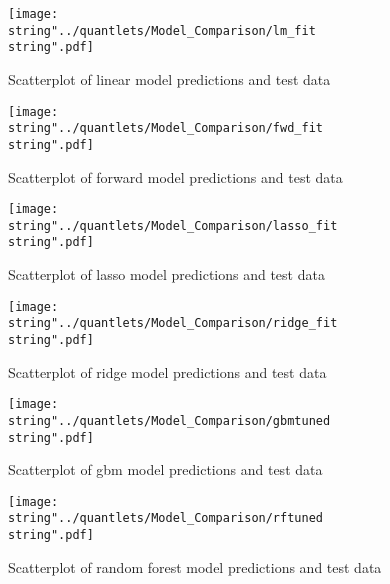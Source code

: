 \begin{figure}[H]
\centering
	\texttt{[image: \\string"../quantlets/Model\_Comparison/lm\_fit\\string".pdf]}
  	\caption{Scatterplot of linear model predictions and test data}
  	\label{fig:lm}
\end{figure}

\begin{figure}[H]
\centering
	\texttt{[image: \\string"../quantlets/Model\_Comparison/fwd\_fit\\string".pdf]}
  	\caption{Scatterplot of forward model predictions and test data}
  	\label{fig:fwd}
\end{figure}

\begin{figure}[H]
\centering
	\texttt{[image: \\string"../quantlets/Model\_Comparison/lasso\_fit\\string".pdf]}
  	\caption{Scatterplot of lasso model predictions and test data}
  	\label{fig:lasso}
\end{figure}

\begin{figure}[H]
\centering
	\texttt{[image: \\string"../quantlets/Model\_Comparison/ridge\_fit\\string".pdf]}
  	\caption{Scatterplot of ridge model predictions and test data}
  	\label{fig:ridge}
\end{figure}

\begin{figure}[H]
\centering
	\texttt{[image: \\string"../quantlets/Model\_Comparison/gbmtuned\\string".pdf]}
  	\caption{Scatterplot of gbm model predictions and test data}
  	\label{fig:gbm}
\end{figure}

\begin{figure}[H]
\centering
	\texttt{[image: \\string"../quantlets/Model\_Comparison/rftuned\\string".pdf]}
  	\caption{Scatterplot of random forest model predictions and test data}
  	\label{fig:rf}
\end{figure}

